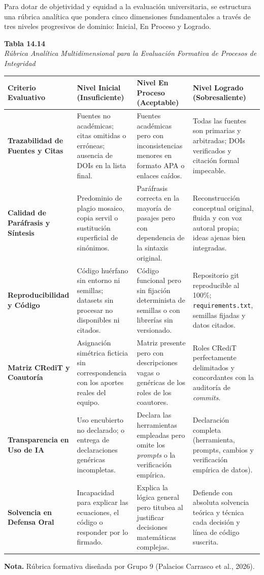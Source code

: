 Para dotar de objetividad y equidad a la evaluación universitaria, se estructura una rúbrica analítica que pondera cinco dimensiones fundamentales a través de tres niveles progresivos de dominio: Inicial, En Proceso y Logrado.

\begin{table}[htbp]
\centering
\small
\renewcommand{\arraystretch}{1.25}
\textbf{Tabla 14.14}\\[0.15cm]
\textit{Rúbrica Analítica Multidimensional para la Evaluación Formativa de Procesos de Integridad}\\[0.25cm]
\begin{tabularx}{\textwidth}{p{2.8cm}X X X}
\toprule
\textbf{Criterio Evaluativo} & \textbf{Nivel Inicial (Insuficiente)} & \textbf{Nivel En Proceso (Aceptable)} & \textbf{Nivel Logrado (Sobresaliente)} \\
\midrule
\textbf{Trazabilidad de Fuentes y Citas} & Fuentes no académicas; citas omitidas o erróneas; ausencia de DOIs en la lista final. & Fuentes académicas pero con inconsistencias menores en formato APA o enlaces caídos. & Todas las fuentes son primarias y arbitradas; DOIs verificados y citación formal impecable. \\
\textbf{Calidad de Paráfrasis y Síntesis} & Predominio de plagio mosaico, copia servil o sustitución superficial de sinónimos. & Paráfrasis correcta en la mayoría de pasajes pero con dependencia de la sintaxis original. & Reconstrucción conceptual original, fluida y con voz autoral propia; ideas ajenas bien integradas. \\
\textbf{Reproducibilidad y Código} & Código huérfano sin entorno ni semillas; datasets sin procesar no disponibles ni citados. & Código funcional pero sin fijación determinista de semillas o con librerías sin versionado. & Repositorio git reproducible al 100\%; \texttt{requirements.txt}, semillas fijadas y datos citados. \\
\textbf{Matriz CRediT y Coautoría} & Asignación simétrica ficticia sin correspondencia con los aportes reales del equipo. & Matriz presente pero con descripciones vagas o genéricas de los roles de los coautores. & Roles CRediT perfectamente delimitados y concordantes con la auditoría de \textit{commits}. \\
\textbf{Transparencia en Uso de IA} & Uso encubierto no declarado; o entrega de declaraciones genéricas incompletas. & Declara las herramientas empleadas pero omite los \textit{prompts} o la verificación empírica. & Declaración completa (herramienta, prompts, cambios y verificación empírica de datos). \\
\textbf{Solvencia en Defensa Oral} & Incapacidad para explicar las ecuaciones, el código o responder por lo firmado. & Explica la lógica general pero titubea al justificar decisiones matemáticas complejas. & Defiende con absoluta solvencia teórica y técnica cada decisión y línea de código suscrita. \\
\bottomrule
\end{tabularx}
\vspace{0.15cm}
\raggedright \scriptsize \textbf{Nota.} Rúbrica formativa diseñada por Grupo 9 (Palacios Carrasco et al., 2026).
\end{table}


